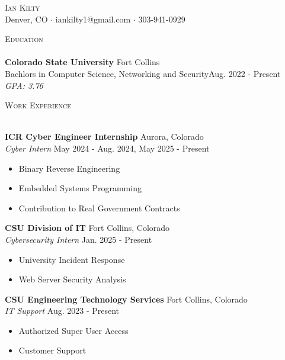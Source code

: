\documentclass[a4paper]{article}
\newcommand{\lineunder} {
    \vspace*{-8pt} \\
    \hspace*{-18pt} \hrulefill \\
}
\newcommand{\header} [1] {
    {\hspace*{-18pt}\vspace*{6pt} \textsc{#1}}
    \vspace*{-6pt} \lineunder
}
\begin{document}
\vspace*{-40pt}

    

\vspace*{-10pt}
\begin{center}
	{\Huge \scshape {Ian Kilty}}\\
	Denver, CO $\cdot$ iankilty1@gmail.com $\cdot$ 303-941-0929\\
\end{center}

\header{Education}
\textbf{Colorado State University}
\hfill Fort Collins\\

Bachlors in Computer Science, Networking and Security\hfill Aug. 2022 - Present\\

\textit{GPA: 3.76}
\vspace{2mm}

\header{Work Experience}
\vspace{1mm}

\textbf{ICR Cyber Engineer Internship} \hfill Aurora, Colorado\\
\textit{Cyber Intern} \hfill May 2024 - Aug. 2024, May 2025 - Present\textbf{}\\
\vspace{-1mm}
\begin{itemize} \itemsep 1pt
    \item Binary Reverse Engineering
	\item Embedded Systems Programming
	\item Contribution to Real Government Contracts
\end{itemize}

\textbf{CSU Division of IT} \hfill Fort Collins, Colorado\\
\textit{Cybersecurity Intern} \hfill Jan. 2025 - Present\\
\vspace{-1mm}
\begin{itemize} \itemsep 1pt
	\item University Incident Response
	\item Web Server Security Analysis
\end{itemize}

\textbf{CSU Engineering Technology Services} \hfill Fort Collins, Colorado\\
\textit{IT Support} \hfill Aug. 2023 - Present\\
\vspace{-1mm}
\begin{itemize} \itemsep 1pt
	\item Authorized Super User Access
    \item Customer Support
\end{itemize}
\end{document}
